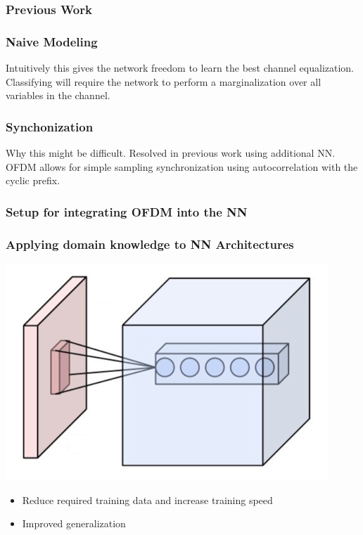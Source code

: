 \documentclass{beamer}
\begin{document}
\subsubsection{Previous Work}

\begin{frame}
	\frametitle{Naive Modeling}
	Intuitively this gives the network freedom to learn the best channel equalization. Classifying will require the
	network to perform a marginalization over all variables in the channel.
\end{frame}

\begin{frame}
	\frametitle{Synchonization}
	Why this might be difficult. Resolved in previous work using additional NN.
	OFDM allows for simple sampling synchronization using autocorrelation with the cyclic prefix.
\end{frame}



\subsubsection{Setup for integrating OFDM into the NN}

\begin{frame}
	\frametitle{Applying domain knowledge to NN Architectures}
	\includegraphics[scale=.25]{Images/Conv_layer.png}
	\begin{itemize}
		\item Reduce required training data and increase training speed
		\item Improved generalization
	\end{itemize}
\end{frame}
\end{document}
